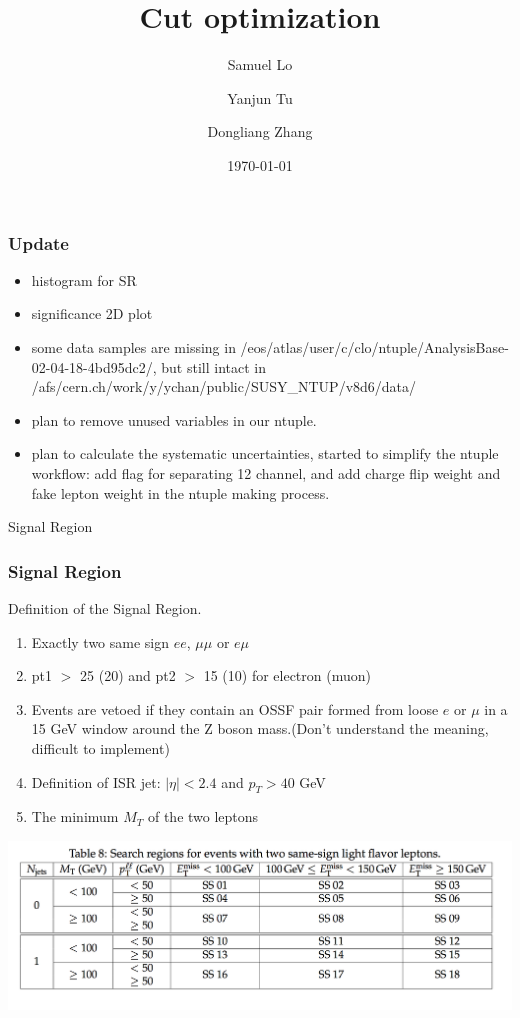 \documentclass[mathserif,serif]{beamer}
\title{Cut optimization}
\author
{
Samuel Lo \inst{1}
\and
Yanjun Tu  \inst{1}
\and
Dongliang Zhang  \inst{2}
}
\institute
{
\inst{1}
The University of Hong Kong
\and
\inst{2}
University of Michigan
}
\date{\today}
\begin{document}
\frame{\titlepage}

\begin{frame}
\frametitle{Update}
\begin{itemize}
\normalsize
\item histogram for SR
\item significance 2D plot
\item some data samples are missing in /eos/atlas/user/c/clo/ntuple/AnalysisBase-02-04-18-4bd95dc2/, but still intact in /afs/cern.ch/work/y/ychan/public/SUSY\_NTUP/v8d6/data/
\item plan to remove unused variables in our ntuple.
\item plan to calculate the systematic uncertainties, started to simplify the ntuple workflow: add flag for separating 12 channel, and add charge flip weight and fake lepton weight in the ntuple making process.
\end{itemize}
\end{frame}

\begin{frame}
\begin{center}
\huge
Signal Region
\end{center}
\end{frame}

\begin{frame}
\frametitle{Signal Region}
Definition of the Signal Region.
\begin{enumerate}
\item Exactly two same sign $ee$, $\mu\mu$ or $e\mu$
\item pt1 $>$ 25 (20) and pt2 $>$ 15 (10) for electron (muon)
\item Events are vetoed if they contain an OSSF pair formed from loose $e$ or $\mu$ in a 15 GeV window around the Z boson mass.(Don't understand the meaning, difficult to implement)
\item Definition of ISR jet: $|\eta| < 2.4$ and $p_T > 40$ GeV
\item The minimum $M_T$ of the two leptons
\end{enumerate}
\includegraphics[width=1\textwidth]{data/SR.png}
\end{frame}
\end{document}

